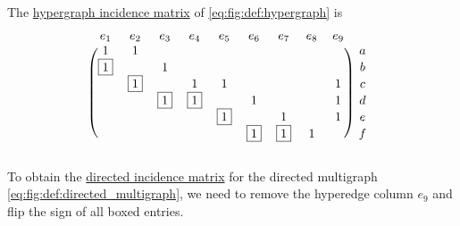\begin{example}\label{ex:incidence_matrices}
  The \hyperref[def:undirected_incidence_matrix]{hypergraph incidence matrix} of \eqref{eq:fig:def:hypergraph} is
  \begin{equation}\label{eq:ex:incidence_matrices}
    \begin{blockarray}{*{9}{c} c}
      e_1      & e_2      & e_3      & e_4      & e_5      & e_6      & e_7      & e_8 & e_9 &   \\
    \begin{block}{(*{9}{c}) c}
      1        & 1        &          &          &          &          &          &     &     & a \\
      \fbox{1} &          & 1        &          &          &          &          &     &     & b \\
               & \fbox{1} &          & 1        & 1        &          &          &     & 1   & c \\
               &          & \fbox{1} & \fbox{1} &          & 1        &          &     & 1   & d \\
               &          &          &          & \fbox{1} &          & 1        &     & 1   & e \\
               &          &          &          &          & \fbox{1} & \fbox{1} & 1   &     & f \\
    \end{block}
    \end{blockarray}
  \end{equation}

  To obtain the \hyperref[def:directed_incidence_matrix]{directed incidence matrix} for the directed multigraph \eqref{eq:fig:def:directed_multigraph}, we need to remove the hyperedge column \( e_9 \) and flip the sign of all boxed entries.
\end{example}
